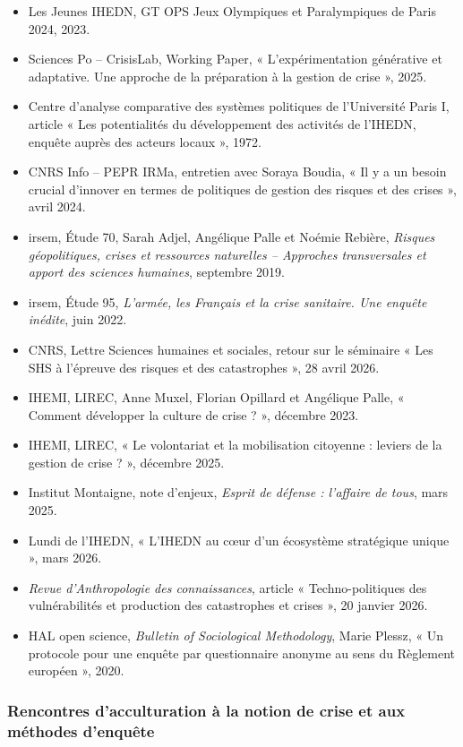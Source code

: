 \begin{itemize}[leftmargin=*]
    \item Les Jeunes IHEDN, GT OPS Jeux Olympiques et Paralympiques de Paris 2024, 2023.
    \item Sciences Po -- CrisisLab, Working Paper, « L'expérimentation générative et adaptative. Une approche de la préparation à la gestion de crise », 2025.
    \item Centre d'analyse comparative des systèmes politiques de l'Université Paris I, article « Les potentialités du développement des activités de l'IHEDN, enquête auprès des acteurs locaux », 1972.
    \item CNRS Info -- PEPR IRMa, entretien avec Soraya Boudia, « Il y a un besoin crucial d'innover en termes de politiques de gestion des risques et des crises », avril 2024.
    \item \gls{irsem}, Étude 70, Sarah Adjel, Angélique Palle et Noémie Rebière, \textit{Risques géopolitiques, crises et ressources naturelles -- Approches transversales et apport des sciences humaines}, septembre 2019.
    \item \gls{irsem}, Étude 95, \textit{L'armée, les Français et la crise sanitaire. Une enquête inédite}, juin 2022.
    \item CNRS, Lettre Sciences humaines et sociales, retour sur le séminaire « Les SHS à l'épreuve des risques et des catastrophes », 28 avril 2026.
    \item IHEMI, LIREC, Anne Muxel, Florian Opillard et Angélique Palle, « Comment développer la culture de crise ? », décembre 2023.
    \item IHEMI, LIREC, « Le volontariat et la mobilisation citoyenne : leviers de la gestion de crise ? », décembre 2025.
    \item Institut Montaigne, note d'enjeux, \textit{Esprit de défense : l'affaire de tous}, mars 2025.
    \item Lundi de l'IHEDN, « L'IHEDN au cœur d'un écosystème stratégique unique », mars 2026.
    \item \textit{Revue d'Anthropologie des connaissances}, article « Techno-politiques des vulnérabilités et production des catastrophes et crises », 20 janvier 2026.
    \item HAL open science, \textit{Bulletin of Sociological Methodology}, Marie Plessz, « Un protocole pour une enquête par questionnaire anonyme au sens du Règlement européen », 2020.
\end{itemize}

\subsubsection*{Rencontres d'acculturation à la notion de crise et aux méthodes d'enquête}

